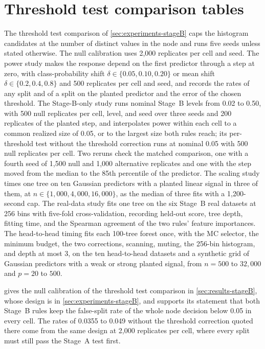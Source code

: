 \section{Threshold test comparison tables}
\label{app:stageB-tables}

The threshold test comparison of \cref{sec:experiments-stageB} caps the
histogram candidates at the number of distinct values in the node and runs
five seeds unless stated otherwise. The null calibration uses 2,000 replicates
per cell and seed. The power study makes the response depend on the first
predictor through a step at zero, with class-probability shift
$\delta\in\{0.05,0.10,0.20\}$ or mean shift $\delta\in\{0.2,0.4,0.8\}$ and 500
replicates per cell and seed, and records the rates of any split and of a split
on the planted predictor and the error of the chosen threshold. The
Stage-B-only study runs nominal Stage~B levels from 0.02 to 0.50, with 500 null
replicates per cell, level, and seed over three seeds and 200 replicates of the
planted step, and interpolates power within each cell to a common realized
size of 0.05, or to the largest size both rules reach; its per-threshold test
without the threshold correction runs at nominal 0.05 with 500 null replicates
per cell. Two reruns check the matched comparison, one with a fourth seed of
1,500 null and 1,000 alternative replicates and one with the step moved from the
median to the 85th percentile of the predictor. The scaling study times one
tree on ten Gaussian predictors with a planted linear signal in three of them,
at $n\in\{1{,}000,4{,}000,16{,}000\}$, as the median of three fits with a
1,200-second cap. The real-data study fits one tree on the six Stage~B real
datasets at 256 bins with five-fold cross-validation, recording held-out score,
tree depth, fitting time, and the Spearman agreement of the two rules' feature
importances. The head-to-head timing fits each 100-tree forest once, with the
MC selector, the minimum budget, the two corrections, scanning, muting, the
256-bin histogram, and depth at most 3, on the ten head-to-head datasets and a
synthetic grid of Gaussian predictors with a weak or strong planted signal,
from $n=500$ to $32{,}000$ and $p=20$ to $500$.

 gives the null calibration of the threshold test
comparison in \cref{sec:results-stageB}, whose design is in
\cref{sec:experiments-stageB}, and supports its statement that both Stage~B
rules keep the false-split rate of the whole node decision below 0.05 in every
cell. The rates of 0.0355 to 0.049 without the threshold correction quoted
there come from the same design at 2,000 replicates per cell, where every split
must still pass the Stage~A test first.

